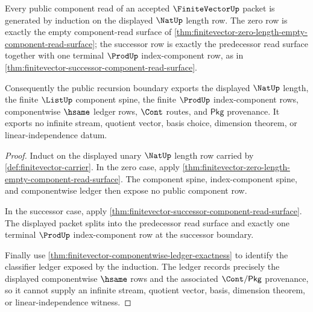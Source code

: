 \begin{theorem}
\label{thm:finitevector-public-component-recursion-boundary}
Every public component read of an accepted $\FiniteVectorUp$ packet is
generated by induction on the displayed $\NatUp$ length row. The zero row is
exactly the empty component-read surface of
\autoref{thm:finitevector-zero-length-empty-component-read-surface}; the
successor row is exactly the predecessor read surface together with one
terminal $\ProdUp$ index-component row, as in
\autoref{thm:finitevector-successor-component-read-surface}.

Consequently the public recursion boundary exports the displayed $\NatUp$
length, the finite $\ListUp$ component spine, the finite $\ProdUp$
index-component rows, componentwise $\hsame$ ledger rows, $\Cont$ routes, and
$\mathsf{Pkg}$ provenance. It exports no infinite stream, quotient vector,
basis choice, dimension theorem, or linear-independence datum.
\end{theorem}
\begin{proof}
Induct on the displayed unary $\NatUp$ length row carried by
\autoref{def:finitevector-carrier}. In the zero case, apply
\autoref{thm:finitevector-zero-length-empty-component-read-surface}. The
component spine, index-component spine, and componentwise ledger then expose no
public component row.

In the successor case, apply
\autoref{thm:finitevector-successor-component-read-surface}. The displayed
packet splits into the predecessor read surface and exactly one terminal
$\ProdUp$ index-component row at the successor boundary.

Finally use \autoref{thm:finitevector-componentwise-ledger-exactness} to
identify the classifier ledger exposed by the induction. The ledger records
precisely the displayed componentwise $\hsame$ rows and the associated
$\Cont/\mathsf{Pkg}$ provenance, so it cannot supply an infinite stream,
quotient vector, basis, dimension theorem, or linear-independence witness.
\end{proof}

